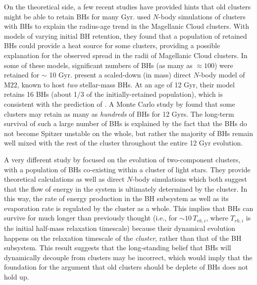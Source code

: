 \documentclass[12pt,preprint]{aastex}
\begin{document}
On the theoretical side, a few recent studies have provided hints that old clusters might be able to retain BHs for many Gyr. \cite{Mackey2008} used $N$-body simulations of clusters with BHs to explain the radius-age trend in the Magellanic Cloud clusters. With models of varying initial BH retention, they found that a population of retained BHs could provide a heat source for some clusters, providing a possible explanation for the observed spread in the radii of Magellanic Cloud clusters. In some of these models, significant numbers of BHs (as many as $\approx 100$) were retained for $\sim$ 10 Gyr. 
\cite{Sippel2013} present a scaled-down (in mass) direct $N$-body model of M22, known to host \emph{two} stellar-mass BHs. At an age of 12 Gyr, their model retains 16 BHs (about 1/3 of the initially-retained population), which is consistent with the prediction of \cite{Strader2012}. A Monte Carlo study by \cite{Morscher2013} found that some clusters may retain as many as \emph{hundreds} of BHs for 12 Gyrs.  The long-term survival of such a large number of BHs is explained by the fact that the BHs do not become Spitzer unstable on the whole, but rather the majority of BHs remain well mixed with the rest of the cluster throughout the entire 12 Gyr evolution.

A very different study by \cite{Breen2013} focused on the evolution of two-component clusters, with a population of BHs co-existing within a cluster of light stars. They provide theoretical calculations as well as direct $N$-body simulations which both suggest that the flow of energy in the system is ultimately determined by the cluster. In this way, the rate of energy production in the BH subsystem as well as its evaporation rate is regulated by the cluster as a whole. This implies that BHs can survive for much longer than previously thought (i.e., for $\sim 10\, T_{rh,i}$, where $T_{rh,i}$ is the initial half-mass relaxation timescale) because their dynamical evolution happens on the relaxation timescale of the \emph{cluster}, rather than that of the BH subsystem. This result suggests that the long-standing belief that BHs will dynamically decouple from clusters may be incorrect, which would imply that the foundation for the argument that old clusters should be deplete of BHs does not hold up.
\end{document}
